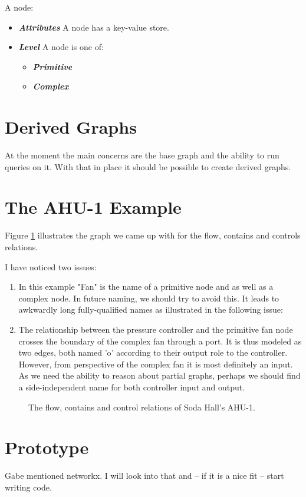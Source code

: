 \documentclass{article}
\newcommand{\textdesc}[1]{\textit{\textbf{#1}}}
\newcommand{\descitem}[1]{\item \textdesc{#1}}
\newcommand{\includeSVG}[1]{
  \texttt{[image: ./figs/\#1.pdf]}
}
\begin{document}
A node:
\begin{itemize}
  \descitem{Attributes} A node has a key-value store.
  \descitem{Level} A node is one of:
    \begin{itemize}
      \descitem{Primitive}
      \descitem{Complex}
    \end{itemize}
\end{itemize}

\section{Derived Graphs}

At the moment the main concerns are the base graph and the ability to run queries on it. With that in place it should be possible to create derived graphs.

\section{The AHU-1 Example}

Figure \ref{fig:ahu1} illustrates the graph we came up with for the flow, contains and controls relations.

I have noticed two issues:
\begin{enumerate}
  \item In this example "Fan" is the name of a primitive node and as well as a complex node. In future naming, we should try to avoid this. It leads to awkwardly long fully-qualified names as illustrated in the following issue:
  \item The relationship between the pressure controller and the primitive fan node crosses the boundary of the complex fan through a port. It is thus modeled as two edges, both named 'o' according to their output role to the controller. However, from perspective of the complex fan it is most definitely an input. As we need the ability to reason about partial graphs, perhaps we should find a side-independent name for both controller input and output.
\end{enumerate}

\begin{figure}[tp]
  \begin{center}
    \scalebox{0.8}{\includeSVG{ahu1_from_writeboard}}
  \end{center}
  \caption{The flow, contains and control relations of Soda Hall's AHU-1.}
  \label{fig:ahu1}
\end{figure}

\section{Prototype}

Gabe mentioned networkx. I will look into that and -- if it is a nice fit -- start writing code.
\end{document}
